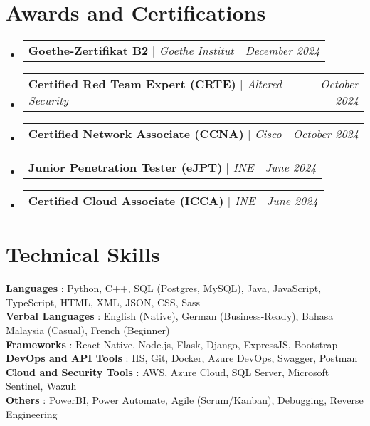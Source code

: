 \documentclass[letterpaper,10pt]{article}
\makeatletter
\newcommand{\sectionspace}{
	\vspace{-20pt}
}
\newcommand{\subheadingtitlevspace}{
	\vspace{-3pt}
}
\newcommand{\titleItem}[1]{
	\textbf{#1}
}
\newcommand{\resumeProjectHeading}[2]{
	\item
	\begin{tabular*}{0.97\textwidth}{l@{\extracolsep{\fill}}r}
		#1 & \textit{ #2} \\
	\end{tabular*}\vspace{-9pt}
}
\newcommand{\resumeSubHeadingListStart}{\subheadingtitlevspace\begin{itemize}[leftmargin=0.15in, label={}]}
\newcommand{\resumeSubHeadingListEnd}{\end{itemize}}
\makeatother
\begin{document}
	
	\section{Awards and Certifications}
	\resumeSubHeadingListStart
	\resumeProjectHeading
	{\titleItem{Goethe-Zertifikat B2} \emph{ $|$ Goethe Institut}}{December 2024}
	\resumeProjectHeading
	{\titleItem{Certified Red Team Expert (CRTE)} \emph{ $|$ Altered Security}}{October 2024}
	\resumeProjectHeading
	{\titleItem{Certified Network Associate (CCNA)} \emph{ $|$ Cisco}}{October 2024}
	\resumeProjectHeading
	{\titleItem{Junior Penetration Tester (eJPT)} \emph{ $|$ INE}}{June 2024}
	\resumeProjectHeading
	{\titleItem{Certified Cloud Associate (ICCA)} \emph{ $|$ INE}}{June 2024}
	\resumeSubHeadingListEnd
	
	\section{Technical Skills}
	\subheadingtitlevspace
	\begin{itemize}[leftmargin=0.15in, label={}]
		{\item{
				\titleItem{Languages}{: Python, C++, SQL (Postgres, MySQL), Java, JavaScript, TypeScript, HTML, XML, JSON, CSS, Sass} \\
				\titleItem{Verbal Languages}{: English (Native), German (Business-Ready), Bahasa Malaysia (Casual), French (Beginner)} \\
				\titleItem{Frameworks}{: React Native, Node.js, Flask, Django, ExpressJS, Bootstrap} \\
				\titleItem{DevOps and API Tools}{: IIS, Git, Docker, Azure DevOps, Swagger, Postman} \\
				\titleItem{Cloud and Security Tools}{: AWS, Azure Cloud, SQL Server, Microsoft Sentinel, Wazuh} \\
				\titleItem{Others}{: PowerBI, Power Automate, Agile (Scrum/Kanban), Debugging, Reverse Engineering}
		}}
	\end{itemize}
	\sectionspace
	
	
\end{document}
